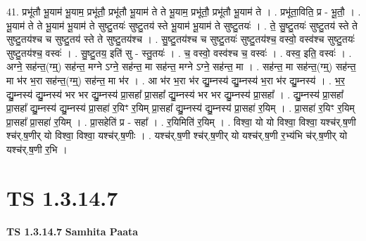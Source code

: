 \documentclass[17pt]{extarticle}
\begin{document}
41. प्रभू॑तौ भू॒याम॑ भू॒याम॒ प्रभू॑तौ॒ प्रभू॑तौ भू॒याम॑ ते ते भू॒याम॒ प्रभू॑तौ॒ प्रभू॑तौ भू॒याम॑ ते । . प्रभू॑ता॒विति॒ प्र - भू॒तौ॒ । . भू॒याम॑ ते ते भू॒याम॑ भू॒याम॑ ते सुष्टु॒तयः॑ सुष्टु॒तय॑ स्ते भू॒याम॑ भू॒याम॑ ते सुष्टु॒तयः॑ । . ते॒ सु॒ष्टु॒तयः॑ सुष्टु॒तय॑ स्ते ते सुष्टु॒तय॑श्च च सुष्टु॒तय॑ स्ते ते सुष्टु॒तय॑श्च । . सु॒ष्टु॒तय॑श्च च सुष्टु॒तयः॑ सुष्टु॒तय॑श्च॒ वस्वो॒ वस्व॑श्च सुष्टु॒तयः॑ सुष्टु॒तय॑श्च॒ वस्वः॑ । . सु॒ष्टु॒तय॒ इति॑ सु - स्तु॒तयः॑ । . च॒ वस्वो॒ वस्व॑श्च च॒ वस्वः॑ । . वस्व॒ इति॒ वस्वः॑ । . अग्ने॒ सह॑न्त॒(ग्म्॒) सह॑न्त॒ मग्ने ऽग्ने॒ सह॑न्त॒ मा सह॑न्त॒ मग्ने ऽग्ने॒ सह॑न्त॒ मा । . सह॑न्त॒ मा सह॑न्त॒(ग्म्॒) सह॑न्त॒ मा भ॑र भ॒रा सह॑न्त॒(ग्म्॒) सह॑न्त॒ मा भ॑र । . आ भ॑र भ॒रा भ॑र द्यु॒म्नस्य॑ द्यु॒म्नस्य॑ भ॒रा भ॑र द्यु॒म्नस्य॑ । . भ॒र॒ द्यु॒म्नस्य॑ द्यु॒म्नस्य॑ भर भर द्यु॒म्नस्य॑ प्रा॒सहा᳚ प्रा॒सहा᳚ द्यु॒म्नस्य॑ भर भर द्यु॒म्नस्य॑ प्रा॒सहा᳚ । . द्यु॒म्नस्य॑ प्रा॒सहा᳚ प्रा॒सहा᳚ द्यु॒म्नस्य॑ द्यु॒म्नस्य॑ प्रा॒सहा॑ र॒यिꣳ र॒यिम् प्रा॒सहा᳚ द्यु॒म्नस्य॑ द्यु॒म्नस्य॑ प्रा॒सहा॑ र॒यिम् । . प्रा॒सहा॑ र॒यिꣳ र॒यिम् प्रा॒सहा᳚ प्रा॒सहा॑ र॒यिम् । . प्रा॒सहेति॑ प्र - सहा᳚ । . र॒यिमिति॑ र॒यिम् । . विश्वा॒ यो यो विश्वा॒ विश्वा॒ यश्च॑र्.ष॒णी श्च॑र्.ष॒णीर् यो विश्वा॒ विश्वा॒ यश्च॑र्.ष॒णीः । . यश्च॑र्.ष॒णी श्च॑र्.ष॒णीर् यो यश्च॑र्.ष॒णी र॒भ्य॑भि च॑र्.ष॒णीर् यो यश्च॑र्.ष॒णी र॒भि । \newline
\pagebreak
{}

\section{ TS 1.3.14.7 }

\textbf{TS 1.3.14.7 } \newline
\textbf{Samhita Paata} \newline
\end{document}
